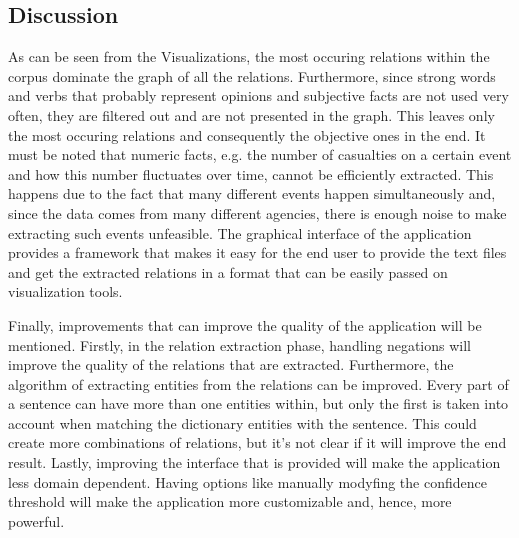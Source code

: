 \documentclass[]{article}
\begin{document}
% 
\subsection{Discussion}
%
As can be seen from the Visualizations, the most occuring relations within the corpus dominate the graph of all the relations. Furthermore, since strong words and verbs that probably represent opinions and subjective facts are not used very often, they are filtered out and are not presented in the graph. This leaves only the most occuring relations and consequently the objective ones in the end. It must be noted that numeric facts, e.g. the number of casualties on a certain event and how this number fluctuates over time, cannot be efficiently extracted. This happens due to the fact that many different events happen simultaneously and, since the data comes from many different agencies, there is enough noise to make extracting such events unfeasible. The graphical interface of the application provides a framework that makes it easy for the end user to provide the text files and get the extracted relations in a format that can be easily passed on visualization tools. 

Finally, improvements that can improve the quality of the application will be mentioned. Firstly, in the relation extraction phase, handling negations will improve the quality of the relations that are extracted. Furthermore, the algorithm of extracting entities from the relations can be improved. Every part of a sentence can have more than one entities within, but only the first is taken into account when matching the dictionary entities with the sentence. This could create more combinations of relations, but it's not clear if it will improve the end result. Lastly, improving the interface that is provided will make the application less domain dependent. Having options like manually modyfing the confidence threshold will make the application more customizable and, hence, more powerful.
%
\end{document}
